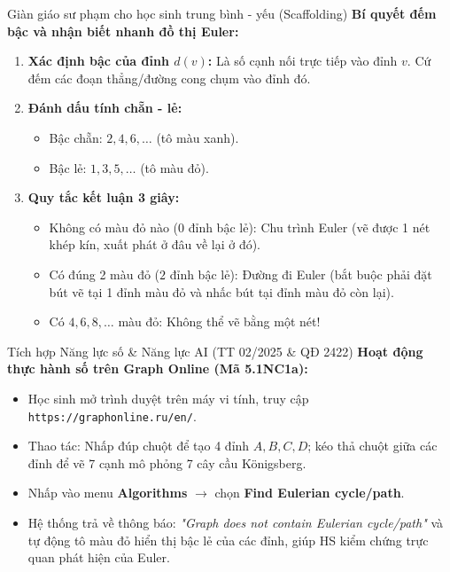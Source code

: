 \documentclass[12pt, a4paper]{article}
\begin{document}
\begin{scaffoldbox}{Giàn giáo sư phạm cho học sinh trung bình - yếu (Scaffolding)}
    \textbf{Bí quyết đếm bậc và nhận biết nhanh đồ thị Euler:}
    \begin{enumerate}[leftmargin=0.6cm]
        \item \textbf{Xác định bậc của đỉnh $d(v)$:} Là số cạnh nối trực tiếp vào đỉnh $v$. Cứ đếm các đoạn thẳng/đường cong chụm vào đỉnh đó.
        \item \textbf{Đánh dấu tính chẵn - lẻ:}
        \begin{itemize}
            \item Bậc chẵn: $2, 4, 6, \dots$ (tô màu xanh).
            \item Bậc lẻ: $1, 3, 5, \dots$ (tô màu đỏ).
        \end{itemize}
        \item \textbf{Quy tắc kết luận 3 giây:}
        \begin{itemize}
            \item Không có màu đỏ nào ($0$ đỉnh bậc lẻ): Chu trình Euler (vẽ được 1 nét khép kín, xuất phát ở đâu về lại ở đó).
            \item Có đúng 2 màu đỏ ($2$ đỉnh bậc lẻ): Đường đi Euler (bắt buộc phải đặt bút vẽ tại 1 đỉnh màu đỏ và nhấc bút tại đỉnh màu đỏ còn lại).
            \item Có $4, 6, 8, \dots$ màu đỏ: Không thể vẽ bằng một nét!
        \end{itemize}
    \end{enumerate}
\end{scaffoldbox}

\begin{aibox}{Tích hợp Năng lực số \& Năng lực AI (TT 02/2025 \& QĐ 2422)}
    \textbf{Hoạt động thực hành số trên Graph Online (Mã 5.1NC1a):}
    \begin{itemize}[leftmargin=0.6cm]
        \item Học sinh mở trình duyệt trên máy vi tính, truy cập \texttt{https://graphonline.ru/en/}.
        \item Thao tác: Nhấp đúp chuột để tạo 4 đỉnh $A, B, C, D$; kéo thả chuột giữa các đỉnh để vẽ 7 cạnh mô phỏng 7 cây cầu Königsberg.
        \item Nhấp vào menu \textbf{Algorithms} $\rightarrow$ chọn \textbf{Find Eulerian cycle/path}.
        \item Hệ thống trả về thông báo: \textit{"Graph does not contain Eulerian cycle/path"} và tự động tô màu đỏ hiển thị bậc lẻ của các đỉnh, giúp HS kiểm chứng trực quan phát hiện của Euler.
    \end{itemize}
\end{aibox}
\end{document}

